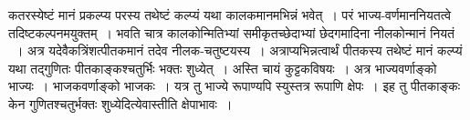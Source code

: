 \documentclass[11pt, openany]{book}
\begin{document}
\newpage

\begin{sloppypar}
\noindent कतरस्येष्टं मानं प्रकल्प्य परस्य तथेष्टं कल्प्यं यथा कालकमानमभिन्नं भवेत्~। परं भाज्य-वर्णमाननियतत्वे तदिष्टकल्पनमयुक्तम्~। भवति चात्र कालकोन्मितिभ्यां समीकृतच्छेदाभ्यां छेदगमादिना नीलकोन्मानं नियतं ~। अत्र यदेवैकत्रिंशत्पीतकमानं तदेव नीलक-चतुष्टयस्य~। अत्राप्यभिन्नत्वार्थं पीतकस्य तथेष्टं मानं कल्प्यं यथा तद्गुणितः पीतकाङ्कश्चतुर्भिः भक्तः शुध्येत्~। अस्ति चायं कुट्टकविषयः~। अत्र भाज्यवर्णाङ्को भाज्यः~। भाजकवर्णाङ्को भाजकः~। यत्र तु भाज्ये रूपाण्यपि स्युस्तत्र रूपाणि क्षेपः~। इह तु पीतकाङ्कः केन गुणितश्चतुर्भक्तः शुध्येदित्येवास्तीति क्षेपाभावः~।\\


\end{sloppypar}
\end{document}
